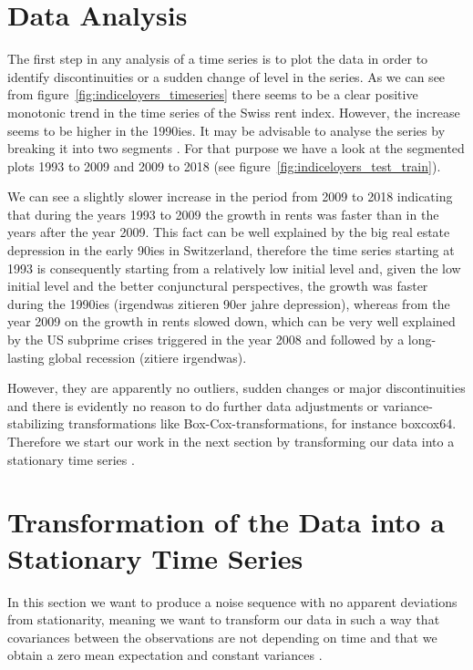 \documentclass[11pt,a4paper]{article}
\begin{document}

\section{Data Analysis}

The first step in any analysis of a time series is to plot the data in order to identify discontinuities or a sudden change of level in the series\cite[p.~23]{bd02}.
As we can see from figure~\ref{fig:indiceloyers_timeseries} there seems to be a clear positive monotonic trend in the time series of the Swiss rent index.
However, the increase seems to be higher in the 1990ies.
It may be advisable to analyse the series by breaking it into two segments \cite[p.~23]{bd02}.
For that purpose we have a look at the segmented plots 1993 to 2009 and 2009 to 2018 (see figure~\ref{fig:indiceloyers_test_train}).

We can see a slightly slower increase in the period from 2009 to 2018 indicating that during the years 1993 to 2009 the growth in rents was faster than in the years after the year 2009.
This fact can be well explained by the big real estate depression in the early 90ies in Switzerland, therefore the time series starting at 1993 is consequently starting from a relatively low initial level and, given the low initial level and the better conjunctural perspectives, the growth  was faster during the 1990ies (irgendwas zitieren 90er jahre depression), whereas from the year 2009 on the growth in rents slowed down, which can be very well explained by the US subprime crises triggered in the year 2008 and followed by a long-lasting global recession (zitiere irgendwas).

However, they are apparently no outliers, sudden changes or major discontinuities and there is evidently no reason to do further data adjustments or variance-stabilizing transformations like Box-Cox-transformations, for instance {boxcox64}.
Therefore we start our work in the next section by transforming our data into a stationary time series \cite[p.~45--82]{bd02}.



\section{Transformation of the Data into a Stationary Time Series}

In this section we want to produce a noise sequence with no apparent deviations from stationarity, meaning we want to transform our data in such a way that covariances between the observations are not depending on time and that we obtain a zero mean expectation and constant variances \cite[pp.~14--23]{bd02}.
\end{document}
